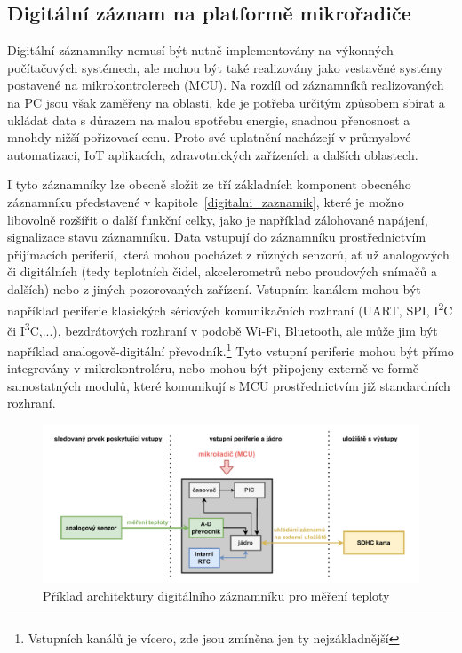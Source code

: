 
\subsection{Digitální záznam na platformě mikrořadiče}
\label{digitalni_zaznamnik_mikroradic}
Digitální záznamníky nemusí být nutně implementovány na výkonných počítačových systémech, ale mohou být také realizovány jako vestavěné systémy postavené na mikrokontrolerech (MCU). Na rozdíl od záznamníků realizovaných na PC jsou však zaměřeny na oblasti, kde je potřeba určitým způsobem sbírat a ukládat data s důrazem na malou spotřebu energie, snadnou přenosnost a mnohdy nižší pořizovací cenu. Proto své uplatnění nacházejí v průmyslové automatizaci, IoT aplikacích, zdravotnických zařízeních a dalších oblastech. \cite{cas_industrial_dataloggers, madgetech_dataloggers_healthcare, springer_industry_monitoring, springer_healthcare_iot_monitoring}

I tyto záznamníky lze obecně složit ze tří základních komponent obecného záznamníku představené v kapitole~\ref{digitalni_zaznamik}, které je možno libovolně rozšířit o další funkční celky, jako je například zálohované napájení, signalizace stavu záznamníku. Data vstupují do záznamníku prostřednictvím přijímacích periferií, která mohou pocházet z různých senzorů, ať už analogových či digitálních (tedy teplotních čidel, akcelerometrů nebo proudových snímačů a dalších) nebo z jiných pozorovaných zařízení. Vstupním kanálem mohou být například periferie klasických sériových komunikačních rozhraní (UART, SPI, I\textsuperscript{2}C či I\textsuperscript{3}C,...), bezdrátových rozhraní v podobě Wi-Fi, Bluetooth, ale může jim být například analogově-digitální převodník.\footnote{Vstupních kanálů je vícero, zde jsou zmíněna jen ty nejzákladnější} Tyto vstupní periferie mohou být přímo integrovány v mikrokontroléru, nebo mohou být připojeny externě ve formě samostatných modulů, které komunikují s MCU prostřednictvím již standardních rozhraní.

\begin{figure}[h]
    \centering
    \includegraphics[width=1.00\textwidth]{obrazky-figures/recorder_mcu.pdf}
    
    \caption{Příklad architektury digitálního záznamníku pro měření teploty}
    \label{fig:mcu-recorder}
\end{figure}

